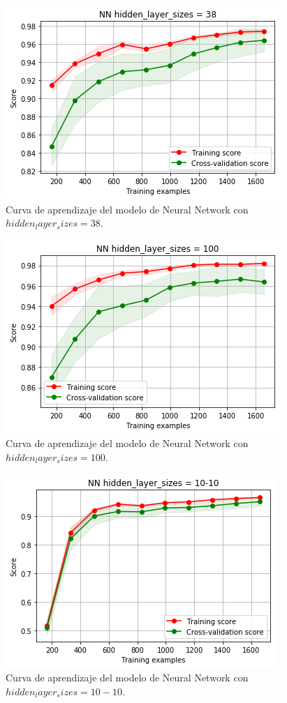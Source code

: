 \documentclass[11pt,a4paper]{article}
\begin{document}
\begin{figure}[H]
    \centering
    \includegraphics[scale=0.7]{img/lc-nn-38.png}
    \caption{Curva de aprendizaje del modelo de Neural Network con $hidden_layer_sizes=38$.}
    \label{fig:lc-nn-38}
\end{figure}

\begin{figure}[H]
    \centering
    \includegraphics[scale=0.7]{img/lc-nn-100.png}
    \caption{Curva de aprendizaje del modelo de Neural Network con $hidden_layer_sizes=100$.}
    \label{fig:lc-nn-100}
\end{figure}

\begin{figure}[H]
    \centering
    \includegraphics[scale=0.7]{img/lc-nn-10-10.png}
    \caption{Curva de aprendizaje del modelo de Neural Network con $hidden_layer_sizes=10-10$.}
    \label{fig:lc-nn-10-10}
\end{figure}
\end{document}
